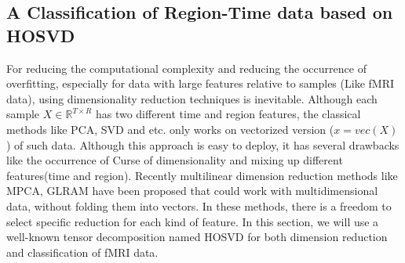 \documentclass[preprint,12pt]{elsarticle}
\begin{document}
	\subsection{ A Classification of Region-Time data  based on  HOSVD}
	For reducing the computational complexity and reducing the occurrence of overfitting, especially for data with large features relative to samples (Like fMRI data), using dimensionality reduction techniques is inevitable. Although each sample $X\in \mathbb{R}^{T\times R}$ has two different time and region features, the classical methods like PCA, SVD and etc. only works on vectorized version ($x=vec(X)$) of such data.
	Although this approach is easy to deploy, it has several drawbacks like the occurrence of Curse of dimensionality and mixing up different features(time and region).
	Recently multilinear dimension reduction methods like MPCA, GLRAM  have been proposed that
	could work with multidimensional data, without folding them into vectors.
	In these methods, there is a freedom to select specific reduction for each kind of feature. In this section, we will use a well-known tensor decomposition named HOSVD for both dimension reduction and classification of fMRI data.
	
\end{document}
